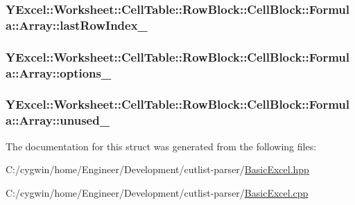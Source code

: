 \subsubsection[{last\+Row\+Index\+\_\+}]{ Y\+Excel\+::\+Worksheet\+::\+Cell\+Table\+::\+Row\+Block\+::\+Cell\+Block\+::\+Formula\+::\+Array\+::last\+Row\+Index\+\_\+}\label{struct_y_excel_1_1_worksheet_1_1_cell_table_1_1_row_block_1_1_cell_block_1_1_formula_1_1_array_a3c1446083f4e72f9b4271bca90f25287}
\hypertarget{struct_y_excel_1_1_worksheet_1_1_cell_table_1_1_row_block_1_1_cell_block_1_1_formula_1_1_array_a61ab5bb71f6f932fd6ec7b3f656dc8be}{}
\subsubsection[{options\+\_\+}]{ Y\+Excel\+::\+Worksheet\+::\+Cell\+Table\+::\+Row\+Block\+::\+Cell\+Block\+::\+Formula\+::\+Array\+::options\+\_\+}\label{struct_y_excel_1_1_worksheet_1_1_cell_table_1_1_row_block_1_1_cell_block_1_1_formula_1_1_array_a61ab5bb71f6f932fd6ec7b3f656dc8be}
\hypertarget{struct_y_excel_1_1_worksheet_1_1_cell_table_1_1_row_block_1_1_cell_block_1_1_formula_1_1_array_a692dd44c10d61d34b30d2f4d726de41a}{}
\subsubsection[{unused\+\_\+}]{ Y\+Excel\+::\+Worksheet\+::\+Cell\+Table\+::\+Row\+Block\+::\+Cell\+Block\+::\+Formula\+::\+Array\+::unused\+\_\+}\label{struct_y_excel_1_1_worksheet_1_1_cell_table_1_1_row_block_1_1_cell_block_1_1_formula_1_1_array_a692dd44c10d61d34b30d2f4d726de41a}


The documentation for this struct was generated from the following files\+:\begin{DoxyCompactItemize}
\item 
C\+:/cygwin/home/\+Engineer/\+Development/cutlist-\/parser/\hyperlink{_basic_excel_8hpp}{Basic\+Excel.\+hpp}\item 
C\+:/cygwin/home/\+Engineer/\+Development/cutlist-\/parser/\hyperlink{_basic_excel_8cpp}{Basic\+Excel.\+cpp}\end{DoxyCompactItemize}
